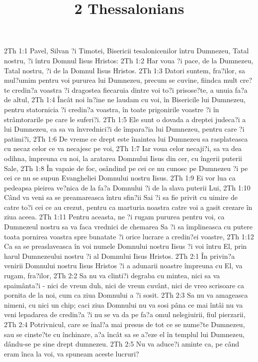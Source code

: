 

\title{2 Thessalonians}

2Th 1:1  Pavel, Silvan ?i Timotei, Bisericii tesalonicenilor întru Dumnezeu, Tatal nostru, ?i întru Domnul Iisus Hristos:
2Th 1:2  Har voua ?i pace, de la Dumnezeu, Tatal nostru, ?i de la Domnul Iisus Hristos.
2Th 1:3  Datori suntem, fra?ilor, sa mul?umim pentru voi pururea lui Dumnezeu, precum se cuvine, fiindca mult cre?te credin?a voastra ?i dragostea fiecaruia dintre voi to?i prisose?te, a unuia fa?a de altul,
2Th 1:4  Încât noi în?ine ne laudam cu voi, în Bisericile lui Dumnezeu, pentru statornicia ?i credin?a voastra, în toate prigonirile voastre ?i în strâmtorarile pe care le suferi?i.
2Th 1:5  Ele sunt o dovada a dreptei judeca?i a lui Dumnezeu, ca sa va învrednici?i de împara?ia lui Dumnezeu, pentru care ?i patimi?i,
2Th 1:6  De vreme ce drept este înaintea lui Dumnezeu sa rasplateasca cu necaz celor ce va necajesc pe voi,
2Th 1:7  Iar voua celor necaji?i, sa va dea odihna, împreuna cu noi, la aratarea Domnului Iisus din cer, cu îngerii puterii Sale,
2Th 1:8  În vapaie de foc, osândind pe cei ce nu cunosc pe Dumnezeu ?i pe cei ce nu se supun Evangheliei Domnului nostru Iisus.
2Th 1:9  Ei vor lua ca pedeapsa pieirea ve?nica de la fa?a Domnului ?i de la slava puterii Lui,
2Th 1:10  Când va veni sa se preamareasca întru sfin?ii Sai ?i sa fie privit cu uimire de catre to?i cei ce au crezut, pentru ca marturia noastra catre voi a gasit crezare în ziua aceea.
2Th 1:11  Pentru aceasta, ne ?i rugam pururea pentru voi, ca Dumnezeul nostru sa va faca vrednici de chemarea Sa ?i sa împlineasca cu putere toata pornirea voastra spre bunatate ?i orice lucrare a credin?ei voastre,
2Th 1:12  Ca sa se preaslaveasca în voi numele Domnului nostru Iisus ?i voi întru El, prin harul Dumnezeului nostru ?i al Domnului Iisus Hristos.
2Th 2:1  În privin?a venirii Domnului nostru Iisus Hristos ?i a adunarii noastre împreuna cu El, va rugam, fra?ilor,
2Th 2:2  Sa nu va clinti?i degraba cu mintea, nici sa va spaimânta?i - nici de vreun duh, nici de vreun cuvânt, nici de vreo scrisoare ca pornita de la noi, cum ca ziua Domnului a ?i sosit.
2Th 2:3  Sa nu va amageasca nimeni, cu nici un chip; caci ziua Domnului nu va sosi pâna ce mai întâi nu va veni lepadarea de credin?a ?i nu se va da pe fa?a omul nelegiuirii, fiul pierzarii,
2Th 2:4  Potrivnicul, care se înal?a mai presus de tot ce se nume?te Dumnezeu, sau se cinste?te cu închinare, a?a încât sa se a?eze el în templul lui Dumnezeu, dându-se pe sine drept dumnezeu.
2Th 2:5  Nu va aduce?i aminte ca, pe când eram înca la voi, va spuneam aceste lucruri?
